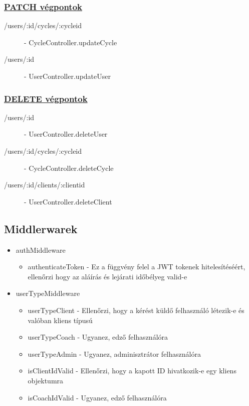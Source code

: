 \subsubsection{\underline{PATCH végpontok}}

\begin{description}
	\item[/users/:id/cycles/:cycleid] - CycleController.updateCycle
	\item[/users/:id] - UserController.updateUser
\end{description}

\subsubsection{\underline{DELETE végpontok}}

\begin{description}
	\item[/users/:id] - UserController.deleteUser
	\item[/users/:id/cycles/:cycleid] - CycleController.deleteCycle
	\item[/users/:id/clients/:clientid] - UserController.deleteClient
\end{description}


\subsection{Middlerwarek}

\begin{itemize}
	\item authMiddleware
	\begin{itemize}
		\item authenticateToken - Ez a függvény felel a JWT tokenek hitelesítéséért, ellenőrzi hogy az aláírás és lejárati időbélyeg valid-e
	\end{itemize}
	\item userTypeMiddleware
	\begin{itemize}
		\item userTypeClient - Ellenőrzi, hogy a kérést küldő felhasználó létezik-e és valóban kliens típusú
		\item userTypeCoach - Ugyanez, edző felhasználóra
		\item userTypeAdmin - Ugyanez, adminisztrátor felhasználóra
		\item isClientIdValid - Ellenőrzi, hogy a kapott ID hivatkozik-e egy kliens objektumra
		\item isCoachIdValid - Ugyanez, edző felhasználóra
	\end{itemize}
\end{itemize}



